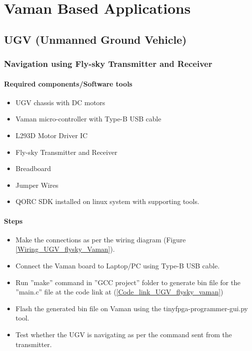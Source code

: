 \chapter{Vaman Based Applications}

\section{UGV (Unmanned Ground Vehicle)}

\subsection{Navigation using Fly-sky Transmitter and Receiver} 
\subsubsection{Required components/Software tools}
\begin{itemize}
    \item  UGV chassis with DC motors
    \item  Vaman micro-controller with Type-B USB cable
    \item  L293D Motor Driver IC
    \item  Fly-sky Transmitter and Receiver
    \item  Breadboard
    \item  Jumper Wires
    \item  QORC SDK installed on linux system with supporting tools.
\end{itemize}

\subsubsection{Steps}
\begin{itemize}
    \item Make the connections as per the wiring diagram (Figure \ref{Wiring_UGV_flysky_Vaman}).
    \item Connect the Vaman board to Laptop/PC using Type-B USB cable.
    \item Run ”make” command in ”GCC project” folder to generate bin file for the ”main.c” file at the code link at (\ref{Code_link_UGV_flysky_vaman})
    \item Flash the generated bin file on Vaman using the tinyfpga-programmer-gui.py tool.
    \item Test whether the UGV is navigating as per the command sent from the transmitter.
\end{itemize}

